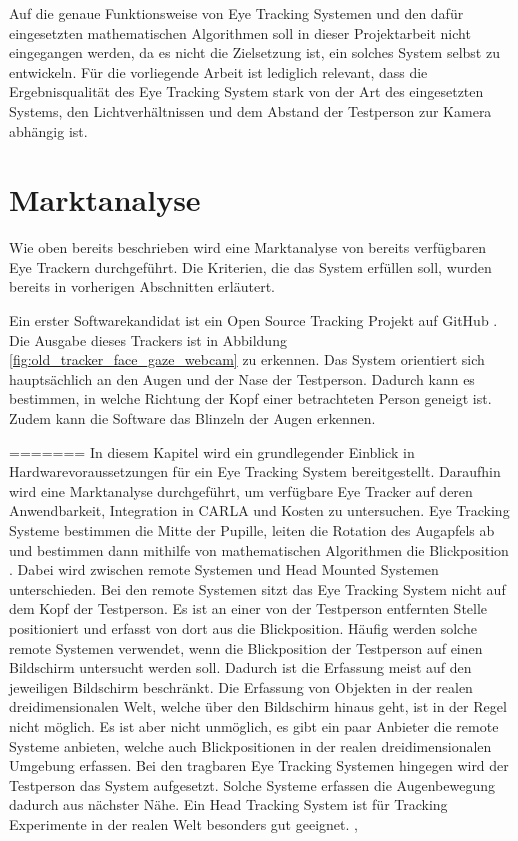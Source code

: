 Auf die genaue Funktionsweise von Eye Tracking Systemen und den dafür eingesetzten mathematischen Algorithmen soll in dieser Projektarbeit nicht eingegangen werden, da es nicht die Zielsetzung ist, ein solches System selbst zu entwickeln. Für die vorliegende Arbeit ist lediglich relevant, dass die Ergebnisqualität des Eye Tracking System stark von der Art des eingesetzten Systems, den Lichtverhältnissen und dem Abstand der Testperson zur Kamera abhängig ist.

\section{Marktanalyse} 

Wie oben bereits beschrieben wird eine Marktanalyse von bereits verfügbaren Eye Trackern durchgeführt. Die Kriterien, die das System erfüllen soll, wurden bereits in vorherigen Abschnitten erläutert. 

Ein erster Softwarekandidat ist ein \Gls{Open Source} Tracking Projekt auf GitHub \cite{lit_code_github_facegazetracker}. Die Ausgabe dieses Trackers ist in Abbildung \ref{fig:old_tracker_face_gaze_webcam} zu erkennen. Das System orientiert sich hauptsächlich an den Augen und der Nase der Testperson. Dadurch kann es bestimmen, in welche Richtung der Kopf einer betrachteten Person geneigt ist. Zudem kann die Software das Blinzeln der Augen erkennen.

=======
In diesem Kapitel wird ein grundlegender Einblick in Hardwarevoraussetzungen für ein Eye Tracking System bereitgestellt. Daraufhin wird eine Marktanalyse durchgeführt, um verfügbare Eye Tracker auf deren Anwendbarkeit, Integration in CARLA und Kosten zu untersuchen.
Eye Tracking Systeme bestimmen die Mitte der Pupille, leiten die Rotation des Augapfels ab und bestimmen dann mithilfe von mathematischen Algorithmen die Blickposition \cite{lit_website_eyeware_eyetracker_blog}. Dabei wird zwischen remote Systemen und Head Mounted Systemen unterschieden. Bei den remote Systemen sitzt das Eye Tracking System nicht auf dem Kopf der Testperson. Es ist an einer von der Testperson entfernten Stelle positioniert und erfasst von dort aus die Blickposition. Häufig werden solche remote Systemen verwendet, wenn die Blickposition der Testperson auf einen Bildschirm untersucht werden soll. Dadurch ist die Erfassung meist auf den jeweiligen Bildschirm beschränkt. Die Erfassung von Objekten in der realen dreidimensionalen Welt, welche über den Bildschirm hinaus geht, ist in der Regel nicht möglich. Es ist aber nicht unmöglich, es gibt ein paar Anbieter die remote Systeme anbieten, welche auch Blickpositionen in der realen dreidimensionalen Umgebung erfassen. Bei den  tragbaren Eye Tracking Systemen hingegen wird der Testperson das System aufgesetzt. Solche Systeme erfassen die Augenbewegung dadurch aus nächster Nähe. Ein Head Tracking System ist für Tracking Experimente in der realen Welt besonders gut geeignet. \cite{lit_website_eyeware_eyetracker_blog},\cite{lit_website_bitbrain}

